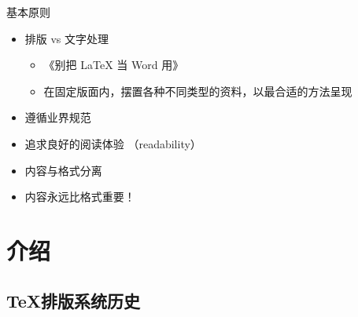 \begin{frame}{基本原则}
\begin{itemize}
  \item<+-> 排版 vs 文字处理

    \begin{itemize}
      \item 《别把 \LaTeX{} 当 Word 用》
      \item {\scriptsize 在固定版面内，摆置各种不同类型的资料，以最合适的方法呈现 \href{https://zh.wikipedia.org/wiki/排版}{\faWikipediaW}}
    \end{itemize}

  \item<+-> 遵循业界规范
  \item<+-> 追求良好的阅读体验 （readability）
  \item<+-> 内容与格式分离
  \item<+-> \alert{内容永远比格式重要！}
\end{itemize}
\end{frame}

\section{介绍}

\subsection{\TeX 排版系统历史}

